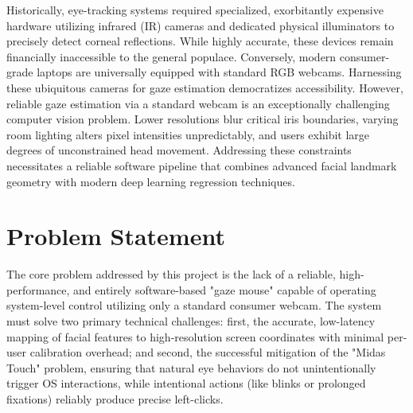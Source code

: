 \documentclass[12pt,a4paper]{report}
\begin{document}
Historically, eye-tracking systems required specialized, exorbitantly expensive hardware utilizing infrared (IR) cameras and dedicated physical illuminators to precisely detect corneal reflections. While highly accurate, these devices remain financially inaccessible to the general populace. Conversely, modern consumer-grade laptops are universally equipped with standard RGB webcams. Harnessing these ubiquitous cameras for gaze estimation democratizes accessibility. However, reliable gaze estimation via a standard webcam is an exceptionally challenging computer vision problem. Lower resolutions blur critical iris boundaries, varying room lighting alters pixel intensities unpredictably, and users exhibit large degrees of unconstrained head movement. Addressing these constraints necessitates a reliable software pipeline that combines advanced facial landmark geometry with modern deep learning regression techniques.

\section{Problem Statement}
The core problem addressed by this project is the lack of a reliable, high-performance, and entirely software-based "gaze mouse" capable of operating system-level control utilizing only a standard consumer webcam. The system must solve two primary technical challenges: first, the accurate, low-latency mapping of facial features to high-resolution screen coordinates with minimal per-user calibration overhead; and second, the successful mitigation of the "Midas Touch" problem, ensuring that natural eye behaviors do not unintentionally trigger OS interactions, while intentional actions (like blinks or prolonged fixations) reliably produce precise left-clicks.
\end{document}
